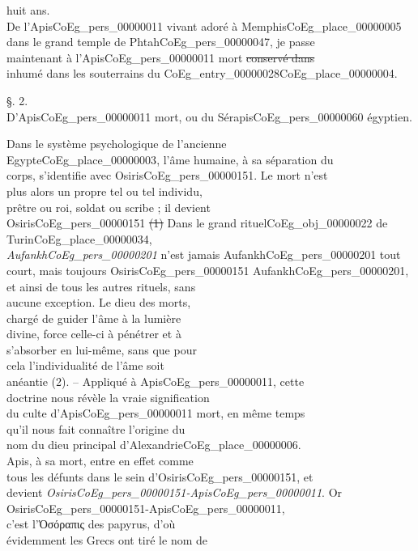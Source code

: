 \documentclass{book}
\begin{document}
{\begin{paracol}{2}
huit ans.\\
\indent De l’Apis\gls{CoEg_pers_00000011} vivant adoré à Memphis\gls{CoEg_place_00000005}\\
dans le grand temple de Phtah\gls{CoEg_pers_00000047}, je passe\\
maintenant à l’Apis\gls{CoEg_pers_00000011} mort \sout{conservé dans}\\
inhumé dans les souterrains du \Gls{CoEg_entry_00000028}\gls{CoEg_place_00000004}.
\begin{center}\S . 2.\\
\noindent D’Apis\gls{CoEg_pers_00000011} mort, ou du Sérapis\gls{CoEg_pers_00000060} égyptien.\end{center}
\noindent Dans le système psychologique de l’ancienne\\
Egypte\gls{CoEg_place_00000003}, l’âme humaine, à sa séparation du\\
corps, s’identifie avec Osiris\gls{CoEg_pers_00000151}. Le mort n’est\\
plus alors un propre tel ou tel individu,\\
prêtre ou roi, soldat ou scribe ; il devient\\
Osiris\gls{CoEg_pers_00000151} \sout{(1)} Dans le grand rituel\gls{CoEg_obj_00000022} de Turin\gls{CoEg_place_00000034},\\
\textit{Aufankh\gls{CoEg_pers_00000201}} n’est jamais Aufankh\gls{CoEg_pers_00000201} tout\\
court, mais toujours Osiris\gls{CoEg_pers_00000151} Aufankh\gls{CoEg_pers_00000201},\\
et ainsi de tous les autres rituels, sans\\
aucune exception. Le dieu des morts,\\
chargé de guider l’âme à la lumière\\
divine, force celle-ci à pénétrer et à\\
s’absorber en lui-même, sans que pour\\
cela l’individualité de l’âme soit\\
anéantie (2). – Appliqué à Apis\gls{CoEg_pers_00000011}, cette\\
doctrine nous révèle la vraie signification\\
du culte d’Apis\gls{CoEg_pers_00000011} mort, en même temps\\
qu’il nous fait connaître l’origine du\\
nom du dieu principal d’Alexandrie\gls{CoEg_place_00000006}.\\
Apis, à sa mort, entre en effet comme\\
tous les défunts dans le sein d’Osiris\gls{CoEg_pers_00000151}, et\\
devient \textit{Osiris\gls{CoEg_pers_00000151}-Apis\gls{CoEg_pers_00000011}}. Or Osiris\gls{CoEg_pers_00000151}-Apis\gls{CoEg_pers_00000011},\\
c’est l’Ὁσόραπις des papyrus, d’où\\
évidemment les Grecs ont tiré le nom de
\end{paracol}

}
\end{document}
